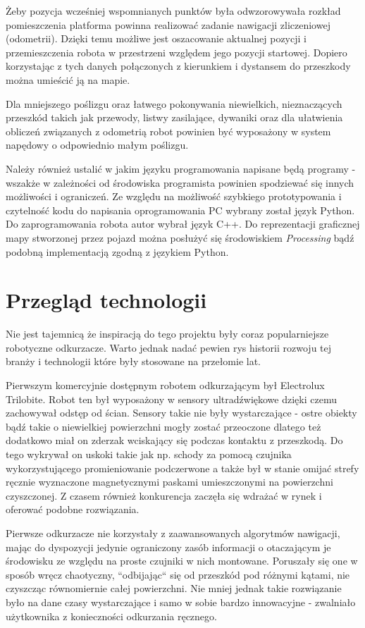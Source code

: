 Żeby pozycja wcześniej wspomnianych punktów była odwzorowywała rozkład pomieszczenia platforma powinna realizować zadanie nawigacji zliczeniowej (odometrii). Dzięki temu możliwe jest oszacowanie aktualnej pozycji i przemieszczenia robota w przestrzeni względem jego pozycji startowej. Dopiero korzystając z tych danych połączonych z kierunkiem i dystansem do przeszkody można umieścić ją na mapie.

Dla mniejszego poślizgu oraz łatwego pokonywania niewielkich, nieznaczących przeszkód takich jak przewody, listwy zasilające, dywaniki oraz dla ułatwienia obliczeń związanych z odometrią robot powinien być wyposażony w system napędowy o odpowiednio małym poślizgu.

Należy również ustalić w jakim języku programowania napisane będą programy - wszakże w zależności od środowiska programista powinien spodziewać się innych możliwości i ograniczeń. Ze względu na możliwość szybkiego prototypowania i czytelność kodu do napisania oprogramowania PC wybrany został język Python\cite{python}. Do zaprogramowania robota autor wybrał język C++\cite{cpp}. Do reprezentacji graficznej mapy stworzonej przez pojazd można posłużyć się środowiskiem \emph{Processing} \cite{GettingStartedWithProcessing} bądź podobną implementacją zgodną z językiem Python.

\section{Przegląd technologii}
Nie jest tajemnicą że inspiracją do tego projektu były coraz popularniejsze robotyczne odkurzacze. Warto jednak nadać pewien rys historii rozwoju tej branży i technologii które były stosowane na przełomie lat.

Pierwszym komercyjnie dostępnym robotem odkurzającym był Electrolux Trilobite\cite{vacuum-history}. Robot ten był wyposażony w sensory ultradźwiękowe dzięki czemu zachowywał odstęp od ścian. Sensory takie nie były wystarczające - ostre obiekty bądź takie o niewielkiej powierzchni mogły zostać przeoczone dlatego też dodatkowo miał on zderzak wciskający się podczas kontaktu z przeszkodą. Do tego wykrywał on uskoki takie jak np. schody za pomocą czujnika wykorzystującego promieniowanie podczerwone a także był w stanie omijać strefy ręcznie wyznaczone magnetycznymi paskami umieszczonymi na powierzchni czyszczonej. Z czasem również konkurencja zaczęła się wdrażać w rynek i oferować podobne rozwiązania.

Pierwsze odkurzacze nie korzystały z zaawansowanych algorytmów nawigacji, mając do dyspozycji jedynie ograniczony zasób informacji o otaczającym je środowisku ze względu na proste czujniki w nich montowane. Poruszały się one w sposób wręcz chaotyczny, ``odbijając`` się od przeszkód pod różnymi kątami, nie czyszcząc równomiernie całej powierzchni. Nie mniej jednak takie rozwiązanie było na dane czasy wystarczające i samo w sobie bardzo innowacyjne - zwalniało użytkownika z konieczności odkurzania ręcznego.

